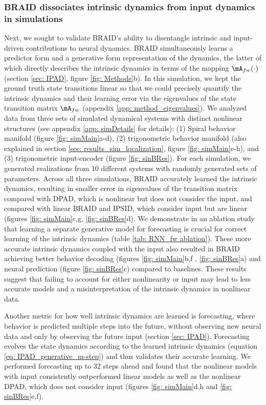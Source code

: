 \documentclass{article} %
\newcommand{\ourmethod}{BRAID}
\newcommand{\ourmethodlinear}{linear \ourmethod}
\begin{document}
\subsubsection{\ourmethod{} dissociates intrinsic dynamics from input dynamics in simulations}\label{sec: main sim results}
Next, we sought to validate \ourmethod{}’s ability to disentangle intrinsic and input-driven contributions to neural dynamics. \ourmethod{} simultaneously learns a predictor form and a generative form representation of the dynamics, the latter of which directly describes the intrinsic dynamics in terms of the mapping \(\mA_{fw}(\cdot)\) (section \ref{sec: IPAD}, figure \ref{fig: Methods}b). In this simulation, we kept the ground truth state transitions linear so that we could precisely quantify the intrinsic dynamics and their learning error via the eigenvalues of the state transition matrix \(\mA_{fw}\) (appendix \ref{app: method_eigenvalues}). We analyzed data from three sets of simulated dynamical systems with distinct nonlinear structures (see appendix \ref{app: simDetails} for details): (1) Spiral behavior manifold (figure \ref{fig: simMain}a-d), (2) trigonometric behavior manifold (also explained in section \ref{sec: results_sim_localization}, figure \ref{fig: simMain}e-h), and (3) trigonometric input-encoder (figure \ref{fig: sinBRes}). For each simulation, we generated realizations from 10 different systems with randomly generated sets of parameters. Across all three simulations, \ourmethod{} accurately learned the intrinsic dynamics, resulting in smaller error in eigenvalues of the transition matrix compared with DPAD, which is nonlinear but does not consider the input, and compared with \ourmethodlinear{} and IPSID, which consider input but are linear (figures \ref{fig: simMain}c,g, \ref{fig: sinBRes}d). We demonstrate in an ablation study that learning a separate generative model for forecasting is crucial for correct learning of the intrinsic dynamics (table \ref{tab: RNN_fw ablation}). These more accurate intrinsic dynamics coupled with the input also resulted in \ourmethod{} achieving better behavior decoding (figures \ref{fig: simMain}b,f , \ref{fig: sinBRes}a) and neural prediction (figure \ref{fig: sinBRes}c) compared to baselines. These results suggest that failing to account for either nonlinearity or input may lead to less accurate models and a misinterpretation of the intrinsic dynamics in nonlinear data. 

Another metric for how well intrinsic dynamics are learned is forecasting, where behavior is predicted multiple steps into the future, without observing new neural data and only by observing the future input (section \ref{sec: IPAD}). Forecasting evolves the state dynamics according to the learned intrinsic dynamics (equation \ref{eq: IPAD_generative_m-step}) and thus validates their accurate learning. We performed forecasting up to 32 steps ahead and found that the nonlinear models with input consistently outperformed linear models as well as the nonlinear DPAD, which does not consider input (figures \ref{fig: simMain}d,h and \ref{fig: sinBRes}e,f).
\end{document}
